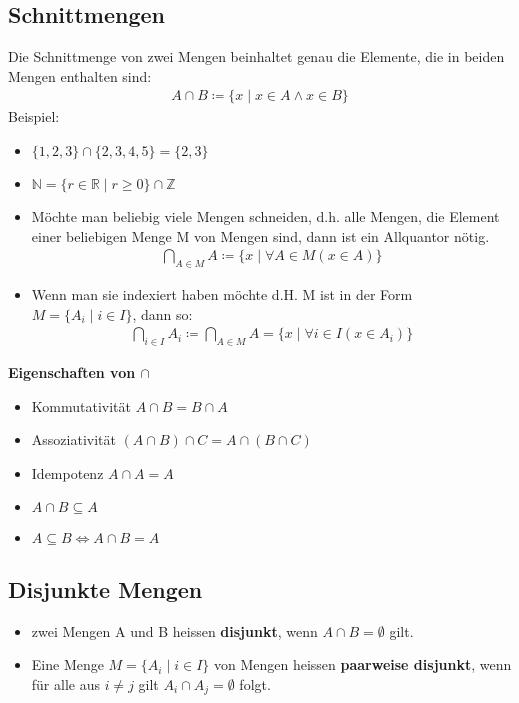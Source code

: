 \subsection{Schnittmengen}
 Die Schnittmenge von zwei Mengen beinhaltet genau die Elemente, die in beiden Mengen enthalten sind:
    \begin{align*}
        A \cap B \coloneqq \{x \mid x \in A \wedge x \in B\}
    \end{align*}
Beispiel:
\begin{itemize}
    \item $\{1,2,3\} \cap \{2,3,4,5\} = \{2,3\}$
    \item $\mathbb{N} = \{r \in \mathbb{R} \mid r \geq 0\} \cap \mathbb{Z}$
\end{itemize}
\begin{itemize}
    \item Möchte man beliebig viele Mengen schneiden, d.h. alle
    Mengen, die Element einer beliebigen Menge M von Mengen
    sind, dann ist ein Allquantor nötig.
    \begin{align*}
        \bigcap_{A \in M} A \coloneqq \{x \mid \forall{A} \in M(x \in A)\}
    \end{align*}
    \item Wenn man sie indexiert haben möchte d.H. M ist in der Form $M = \{A_i \mid i \in I\}$, dann so:
    \begin{align*}
        \bigcap_{i \in I} A_i \coloneqq \bigcap_{A \in M}A = \{x \mid \forall{i} \in I(x \in A_i)\}
    \end{align*}
\end{itemize}
{\bf Eigenschaften von $\cap$}
\begin{itemize}
    \item Kommutativität $A \cap B = B \cap A$
    \item Assoziativität $(A \cap B) \cap C = A \cap (B \cap C)$
    \item Idempotenz $A \cap A = A$
    \item $A \cap B \subseteq A$
    \item $A \subseteq B \Leftrightarrow A \cap B = A $
\end{itemize}
\subsection{Disjunkte Mengen}
\begin{itemize}
    \item zwei Mengen A und B heissen {\bf disjunkt}, wenn $A \cap B = \emptyset$ gilt.
    \item Eine Menge $M = \{A_i \mid i \in I\}$ von Mengen heissen {\bf paarweise disjunkt}, 
    wenn für alle aus $i \neq j$ gilt $A_i \cap A_j = \emptyset$ folgt.
\end{itemize}
